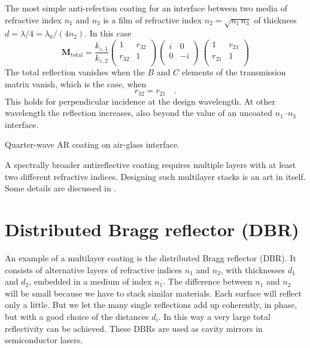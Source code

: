 The most simple anti-refection coating for an interface between two media of refractive index $n_1$ and $n_3$ is a film of refractive index $n_2 = \sqrt{n_1 \, n_3}$ of thickness $d = \lambda / 4 = \lambda_0 / (4 n_2)$. In this case
\begin{equation}
  \mathbf{M}_\text{total}
  = 
  \frac{k_{z,1}}{k_{z,2}} 
  \begin{pmatrix}
  1 & r_{32} \\ r_{32} & 1 \\
  \end{pmatrix} 
\, 
\begin{pmatrix}
  i & 0 \\0 & -i \\
  \end{pmatrix}
\,
\begin{pmatrix}
1 & r_{21} \\ r_{21} & 1 \\
\end{pmatrix} 
\end{equation}
The total reflection vanishes when the $B$ and $C$ elements of the transmission matrix vanish, which is the case, when
\begin{equation}
  r_{32} = r_{21} \quad .
\end{equation}
This holds for perpendicular incidence at the design wavelength. At other wavelength the reflection increases, also beyond the value of an uncoated $n_1$--$n_3$ interface.

\begin{marginfigure}
  \caption{Quarter-wave AR coating on air-glass interface.}
\end{marginfigure}


A spectrally broader antireflective coating requires multiple layers with at least two different refractive indices. Designing such multilayer stacks is an art in itself. Some details are discussed in \cite{Melles_griot_filter}.



\section{Distributed Bragg reflector (DBR) }

An example of a multilayer coating is the distributed Bragg reflector (DBR).  It consists of alternative layers of refractive indices $n_1$ and $n_2$, with thicknesses $d_1$ and $d_2$, embedded in a medium of index $n_1$. The difference between $n_1$ and $n_2$ will be small because we have to stack similar materials. Each surface will reflect only a little. But we let the many single reflections add up coherently, in phase, but with a good choice of the distances $d_i$. In this way a very large total reflectivity can be achieved. These DBRs are used as cavity mirrors in semiconductor lasers.

